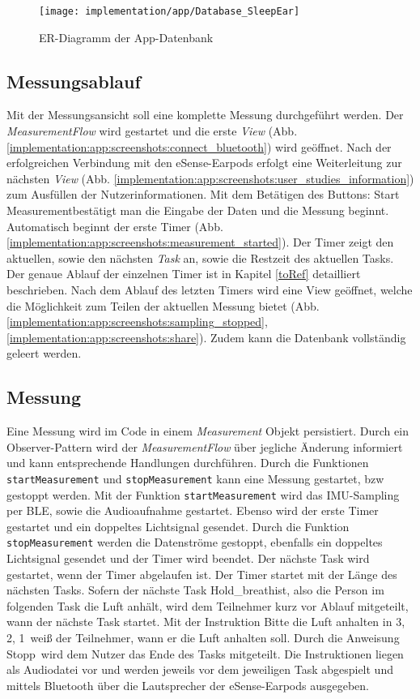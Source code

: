 \begin{figure}[ht]
  \centering
  \texttt{[image: implementation/app/Database\_SleepEar]}
  \caption{ER-Diagramm der App-Datenbank}
  \label{implementation:app:erModel}
\end{figure}

\subsection{Messungsablauf}
Mit der Messungsansicht soll eine komplette Messung durchgeführt werden.
Der \textit{MeasurementFlow} wird gestartet und die erste \textit{View} (Abb. \ref{implementation:app:screenshots:connect_bluetooth}) wird geöffnet.
Nach der erfolgreichen Verbindung mit den eSense-Earpods erfolgt eine Weiterleitung zur nächsten \textit{View} (Abb. \ref{implementation:app:screenshots:user_studies_information}) zum Ausfüllen der Nutzerinformationen. 
Mit dem Betätigen des Buttons: \glqq Start Measurement\grqq bestätigt man die Eingabe der Daten und die Messung beginnt.
Automatisch beginnt der erste Timer (Abb. \ref{implementation:app:screenshots:measurement_started}).
Der Timer zeigt den aktuellen, sowie den nächsten \textit{Task} an, sowie die Restzeit des aktuellen Tasks.
Der genaue Ablauf der einzelnen Timer ist in Kapitel \ref{toRef}  detailliert beschrieben.
Nach dem Ablauf des letzten Timers wird eine View geöffnet, welche die Möglichkeit zum Teilen der aktuellen Messung bietet (Abb. \ref{implementation:app:screenshots:sampling_stopped}, \ref{implementation:app:screenshots:share}).
Zudem kann die Datenbank vollständig geleert werden.

\subsection{Messung}
Eine Messung wird im Code in einem \textit{Measurement} Objekt persistiert.
Durch ein Observer-Pattern wird der \textit{MeasurementFlow} über jegliche Änderung informiert und kann entsprechende Handlungen durchführen.
Durch die Funktionen \texttt{startMeasurement} und \texttt{stopMeasurement} kann eine Messung gestartet, bzw gestoppt werden.
Mit der Funktion \texttt{startMeasurement} wird das IMU-Sampling per BLE, sowie die Audioaufnahme gestartet. 
Ebenso wird der erste Timer gestartet und ein doppeltes Lichtsignal gesendet. 
Durch die Funktion \texttt{stopMeasurement} werden die Datenströme gestoppt, ebenfalls ein doppeltes Lichtsignal gesendet und der Timer wird beendet.
Der nächste Task wird gestartet, wenn der Timer abgelaufen ist. Der Timer startet mit der Länge des nächsten Tasks.
Sofern der nächste Task \glqq Hold\_breath\grqq ist, also die Person im folgenden Task die Luft anhält, wird dem Teilnehmer kurz vor Ablauf mitgeteilt, wann der nächste Task startet.
Mit der Instruktion \glqq Bitte die Luft anhalten in 3, 2, 1\grqq \ weiß der Teilnehmer, wann er die Luft anhalten soll.
Durch die Anweisung \glqq Stopp\grqq \ wird dem Nutzer das Ende des Tasks mitgeteilt. 
Die Instruktionen liegen als Audiodatei vor und werden jeweils vor dem jeweiligen Task abgespielt und mittels Bluetooth über die Lautsprecher der eSense-Earpods ausgegeben.

